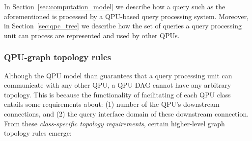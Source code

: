 In Section~\ref{sec:computation_model} we describe how a query such as the aforementioned is processed by a QPU-based
query processing system.
Moreover, in Section~\ref{sec:qpc_tree} we describe how the set of queries a query processing unit can process are
represented and used by other QPUs.

\subsubsection{QPU-graph topology rules}
\label{sec:graph_topology}
Although the QPU model than guarantees that a query processing unit can communicate with any other QPU,
a QPU DAG cannot have any arbitrary topology.
This is because the functionality of facilitating of each QPU class entails some requirements about:
(1) number of the QPU's downstream connections, and (2) the query interface domain of these downstream connection.
From these \textit{class-specific topology requirements}, certain higher-level graph topology rules emerge:
